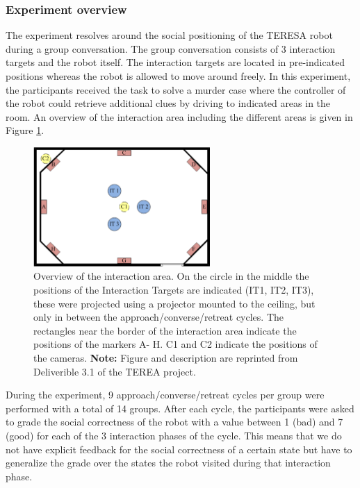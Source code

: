 \documentclass[a4paper,11pt]{report}
\begin{document}
\subsubsection{Experiment overview}
\label{sec:experiment_overview}
The experiment resolves around the social positioning of the TERESA robot during a group conversation.
The group conversation consists of 3 interaction targets and the robot itself.
The interaction targets are located in pre-indicated positions whereas the robot is allowed to move around freely.
In this experiment, the participants received the task to solve a murder case where the controller of the robot could retrieve additional clues by driving to indicated areas in the room.
An overview of the interaction area including the different areas is given in Figure \ref{fig:overview_interaction_area}.
\begin{figure}
    \centering
    \includegraphics[width=0.6\textwidth]{figures/layout_twente_exp_copy_from_paper.png}
    \caption{Overview of the interaction area. On the circle in the middle the positions of the Interaction Targets are indicated (IT1, IT2, IT3), these were projected using a projector
mounted to the ceiling, but only in between the approach/converse/retreat cycles. The
rectangles near the border of the interaction area indicate the positions of the markers A-
H. C1 and C2 indicate the positions of the cameras. \textbf{Note:} Figure and description are reprinted from Deliverible 3.1\cite{teresa_d3.1} of the TEREA project.}
    	\label{fig:overview_interaction_area}
\end{figure} 
During the experiment, 9 approach/converse/retreat cycles per group were performed with a total of 14 groups. 
After each cycle, the participants were asked to grade the social correctness of the robot with a value between 1 (bad) and 7 (good) for each of the 3 interaction phases of the cycle.
This means that we do not have explicit feedback for the social correctness of a certain state but have to generalize the grade over the states the robot visited during that interaction phase.
\end{document}
